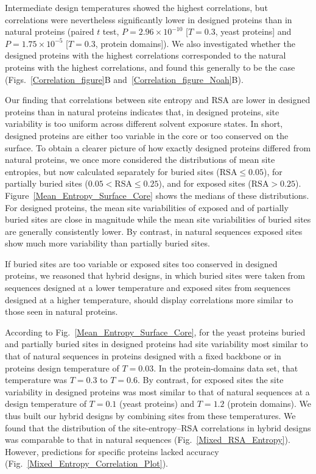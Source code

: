 \documentclass[12pt]{article}
\begin{document}
Intermediate design temperatures showed the highest correlations, but correlations were nevertheless significantly lower in designed proteins than in natural proteins (paired $t$ test, $P=2.96\times 10^{-10}$ [$T=0.3$, yeast proteins] and $P= 1.75\times 10^{-5}$ [$T=0.3$, protein domains]).  We also investigated whether the designed proteins with the highest correlations corresponded to the natural proteins with the highest correlations, and found this generally to be the case (Figs.~\ref{Correlation_figure}B and~\ref{Correlation_figure_Noah}B).

Our finding that correlations between site entropy and RSA are lower in designed proteins than in natural proteins indicates that, in designed proteins, site variability is too uniform across different solvent exposure states. In short, designed proteins are either too variable in the core or too conserved on the surface. To obtain a clearer picture of how exactly designed proteins differed from natural proteins, we once more considered the distributions of mean site entropies, but now calculated separately for buried sites ($\text{RSA}\leq0.05$), for partially buried sites ($0.05<\text{RSA}\leq0.25$), and for exposed sites ($\text{RSA}>0.25$). Figure~\ref{Mean_Entropy_Surface_Core} shows the medians of these distributions. For designed proteins, the mean site variabilities of exposed and of partially buried sites are close in magnitude while the mean site variabilities of buried sites are generally consistently lower. By contrast, in natural sequences exposed sites show much more variability than partially buried sites.

If buried sites are too variable or exposed sites too conserved in designed proteins, we reasoned that hybrid designs, in which buried sites were taken from sequences designed at a lower temperature and exposed sites from sequences designed at a higher temperature, should display correlations more similar to those seen in natural proteins. 

According to Fig.~\ref{Mean_Entropy_Surface_Core}, for the yeast proteins buried and partially buried sites in designed proteins had site variability most similar to that of natural sequences in proteins designed with a fixed backbone or in proteins design temperature of $T=0.03$. In the protein-domains data set, that temperature was $T=0.3$ to $T = 0.6$.  By contrast, for exposed sites the site variability in designed proteins was most similar to that of natural sequences at a design temperature of $T= 0.1$ (yeast proteins) and $T  = 1.2$ (protein domains).  We thus built our hybrid designs by combining sites from these temperatures. We found that the distribution of the site-entropy--RSA correlations in hybrid designs was comparable to that in natural sequences (Fig.~\ref{Mixed_RSA_Entropy}). However, predictions for specific proteins lacked accuracy (Fig.~\ref{Mixed_Entropy_Correlation_Plot}).
\end{document}
